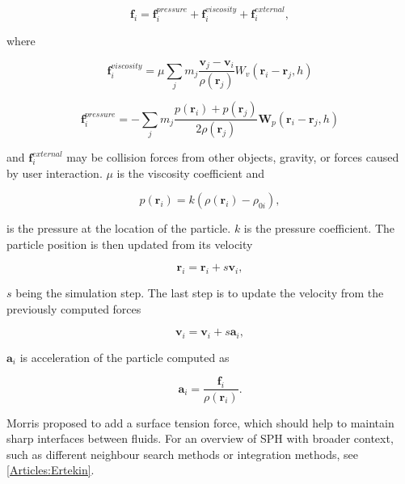 \documentclass[a4paper,report]{IEEEtran}
\begin{document}
\begin{equation}
	\mathbf{f}_i = \mathbf{f}_{i}^{pressure} + \mathbf{f}_{i}^{viscosity} + \mathbf{f}_{i}^{external},
\end{equation}

where 

\begin{equation}
	\mathbf{f}_{i}^{viscosity} = \mu\sum_{j}m_j\frac{\mathbf{v}_j-\mathbf{v}_i}{\rho(\mathbf{r}_j)} W_v(\mathbf{r}_i-\mathbf{r}_j, h)
\end{equation}

\begin{equation}
	\mathbf{f}_{i}^{pressure} = -\sum_{j}m_j\frac{p(\mathbf{r}_i)+p(\mathbf{r}_j)}{2\rho(\mathbf{r}_j)} \mathbf{W}_p(\mathbf{r}_i-\mathbf{r}_j, h)
\end{equation}

and $\mathbf{f}_{i}^{external}$ may be collision forces from other objects, gravity, or forces caused by user interaction. $\mu$ is the viscosity coefficient and 

\begin{equation}
	p(\mathbf{r}_i) = k(\rho(\mathbf{r}_i)-\rho_{0i}),
\end{equation}

is the pressure at the location of the particle. $k$ is the pressure coefficient. The particle position is then updated from its velocity 

\begin{equation}
	\mathbf{r}_i = \mathbf{r}_i + s\mathbf{v}_i,
\end{equation}

$s$ being the simulation step. The last step is to update the velocity from the previously computed forces

\begin{equation}
	\mathbf{v}_i = \mathbf{v}_i + s\mathbf{a}_i,
\end{equation}

$\mathbf{a}_i$ is acceleration of the particle computed as

\begin{equation}
	\mathbf{a}_i = \frac{\mathbf{f}_{i}}{\rho(\mathbf{r}_{i})}.
\end{equation}

Morris \cite{Articles:Morris} proposed to add a surface tension force, which should help to maintain sharp interfaces between fluids. For an overview of SPH with broader context, such as different neighbour search methods or integration methods, see \ref{Articles:Ertekin}.
\end{document}
